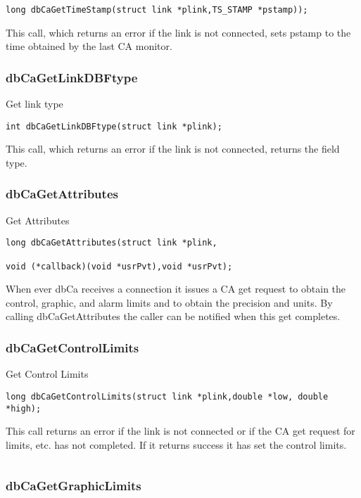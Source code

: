 \begin{verbatim}long dbCaGetTimeStamp(struct link *plink,TS_STAMP *pstamp));
\end{verbatim}This call, which returns an error if the link is not connected, sets pstamp to the time obtained by the last CA monitor.

\subsubsection{dbCaGetLinkDBFtype}

Get link type

\begin{verbatim}int dbCaGetLinkDBFtype(struct link *plink);
\end{verbatim}This call, which returns an error if the link is not connected, returns the field type.

\subsubsection{dbCaGetAttributes}

Get Attributes

\begin{verbatim}long dbCaGetAttributes(struct link *plink,

void (*callback)(void *usrPvt),void *usrPvt);
\end{verbatim}When ever dbCa receives a connection it issues a CA get request to obtain the control, graphic, and alarm limits and to 
obtain the precision and units. By calling dbCaGetAttributes the caller can be notified when this get completes.

\subsubsection{dbCaGetControlLimits}

Get Control Limits

\begin{verbatim}long dbCaGetControlLimits(struct link *plink,double *low, double *high);
\end{verbatim}This call returns an error if the link is not connected or if the CA get request for limits, etc. has not completed. If it returns 
success it has set the control limits.

\begin{verbatim}
\end{verbatim}\subsubsection{dbCaGetGraphicLimits}

